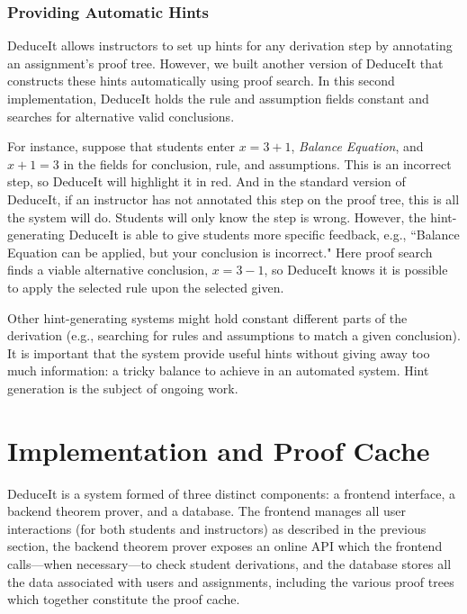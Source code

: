 \documentclass{sigchi}
\newcommand{\msb}[1]{\textbf{\textcolor{cyan}{Michael: #1}}}
\begin{document}
\subsubsection{Providing Automatic Hints}

DeduceIt allows instructors to set up hints for any derivation step by annotating an assignment's proof tree. However, we built another version of DeduceIt that constructs these hints automatically using proof search. In this second implementation, DeduceIt holds the rule and assumption fields constant and searches for alternative valid conclusions. 

For instance, suppose that students enter $x=3+1$, \textit{Balance Equation}, and $x+1=3$ in the fields for conclusion, rule, and assumptions. This is an incorrect step, so DeduceIt will highlight it in red. And in the standard version of DeduceIt, if an instructor has not annotated this step on the proof tree, this is all the system will do. Students will only know the step is wrong. However, the hint-generating DeduceIt is able to give students more specific feedback, e.g., ``Balance Equation can be applied, but your conclusion is incorrect." Here proof search finds a viable alternative conclusion, $x=3-1$, so DeduceIt knows it is possible to apply the selected rule upon the selected given.

Other hint-generating systems might hold constant different parts of the derivation (e.g., searching for rules and assumptions to match a given conclusion). It is important that the system provide useful hints without giving away too much information: a tricky balance to achieve in an automated system. Hint generation is the subject of ongoing work.

\section{Implementation and Proof Cache}


DeduceIt is a system formed of three distinct components: a frontend interface, a backend theorem prover, and a database. The frontend manages all user interactions (for both students and instructors) as described in the previous section, the backend theorem prover exposes an online API which the frontend calls---when necessary---to check student derivations, and the database stores all the data associated with users and assignments, including the various proof trees which together constitute the proof cache. %
\end{document}
